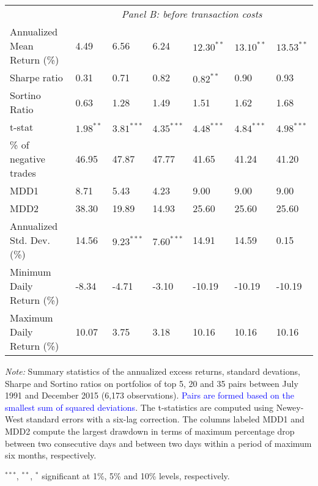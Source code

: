 \documentclass[a4paper]{article}
\begin{document}
\begin{threeparttable}[H]
\begin{tabularx}{\textwidth}{@{\extracolsep{\fill}}lllllll@{}}
		\midrule
& \multicolumn{6}{c}{\textit {Panel B: before transaction costs}} \\ 
		Annualized Mean Return (\%) & 4.49  & 6.56  & 6.24  & $12.30^{**}$ & $13.10^{**}$ & $13.53^{**}$ \\
		Sharpe ratio & 0.31  & 0.71  & 0.82  & $0.82^{**}$  & 0.90  & 0.93 \\
		Sortino Ratio & 0.63  & 1.28  & 1.49  & 1.51  & 1.62  & 1.68 \\
		t-stat & $1.98^{**}$  & $3.81^{***}$  & $4.35^{***}$  & $4.48^{***}$  & $4.84^{***}$  & $4.98^{***}$ \\
		\% of negative trades & 46.95 & 47.87 & 47.77 & 41.65 & 41.24 & 41.20 \\
		MDD1  & 8.71  & 5.43  & 4.23  & 9.00  & 9.00  & 9.00 \\
		MDD2  & 38.30 & 19.89 & 14.93 & 25.60 & 25.60 & 25.60 \\
		Annualized Std. Dev. (\%) & 14.56 & $9.23^{***}$  & $7.60^{***}$  & 14.91 & 14.59 & 0.15 \\
		Minimum Daily Return (\%) & -8.34 & -4.71 & -3.10 & -10.19 & -10.19 & -10.19 \\
		Maximum Daily Return (\%) & 10.07 & 3.75  & 3.18  & 10.16 & 10.16 & 10.16 \\
		\bottomrule
\end{tabularx}
\begin{tablenotes}
\item \textit{Note:} \scriptsize Summary statistics of the annualized excess returns, standard devations, Sharpe and Sortino ratios on portfolios of top 5, 20 and 35 pairs between July 1991 and December 2015 (6,173 observations). \textcolor{blue} {Pairs are formed based on the smallest sum of squared deviations}. The t-statistics are computed using Newey-West standard errors with a six-lag correction. The columns labeled MDD1 and MDD2 compute the largest drawdown in terms of maximum percentage drop between two consecutive days and between two days within a period of maximum six months, respectively.
\item \footnotesize $^{\ast\ast\ast}$, $^{\ast\ast}$, $^{\ast}$  significant at 1\%, 5\% and 10\% levels, respectively.
\end{tablenotes}
\label{tab:table101}
\end{threeparttable}
\end{document}
